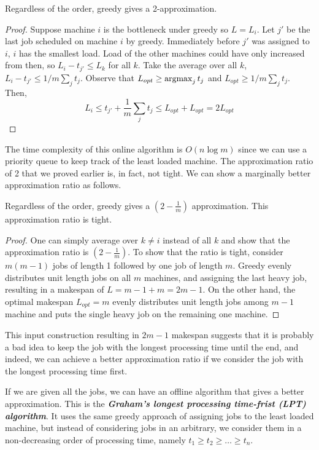 \begin{theorem}
    Regardless of the order, greedy gives a 2-approximation.
\end{theorem}

\begin{proof}
    Suppose machine $i$ is the bottleneck under greedy so $L=L_i$. Let $j'$ be the last job scheduled on machine $i$ by greedy. Immediately before $j'$ was assigned to $i$, $i$ has the smallest load. Load of the other machines could have only increased from then, so $L_i - t_{j'} \leq L_k$ for all $k$. Take the average over all $k$, $L_i - t_{j'} \leq 1/m \sum_{j} t_j$. Observe that $L_{opt} \geq \operatorname*{\mathrm{argmax}}_j t_j$ and $L_{opt} \geq 1/m \sum_{j} t_j$. Then,
    $$
    L_i \leq t_{j'} + \frac{1}{m} \sum_{j} t_j \leq L_{opt} + L_{opt} = 2L_{opt}
    $$
\end{proof}

The time complexity of this online algorithm is $O(n \log m)$ since we can use a priority queue to keep track of the least loaded machine. The approximation ratio of 2 that we proved earlier is, in fact, not tight. We can show a marginally better approximation ratio as follows.

\begin{corollary}
    Regardless of the order, greedy gives a $(2-\frac{1}{m})$ approximation. This approximation ratio is tight.
\end{corollary}

\begin{proof}
    One can simply average over $k \neq i$ instead of all $k$ and show that the approximation ratio is $(2-\frac{1}{m})$. To show that the ratio is tight, consider $m(m-1)$ jobs of length 1 followed by one job of length $m$. Greedy evenly distributes unit length jobs on all $m$ machines, and assigning the last heavy job, resulting in a makespan of $L = m-1+m = 2m-1$. On the other hand, the optimal makespan $L_{opt} = m$ evenly distributes unit length jobs among $m-1$ machine and puts the single heavy job on the remaining one machine.
\end{proof}

This input construction resulting in $2m-1$ makespan suggests that it is probably a bad idea to keep the job with the longest processing time until the end, and indeed, we can achieve a better approximation ratio if we consider the job with the longest processing time first.

If we are given all the jobs, we can have an offline algorithm that gives a better approximation. This is the \textit{\textbf{Graham's longest processing time-frist (LPT) algorithm}}. It uses the same greedy approach of assigning jobs to the least loaded machine, but instead of considering jobs in an arbitrary, we consider them in a non-decreasing order of processing time, namely $t_1 \geq t_2 \geq \ldots \geq t_n$.

